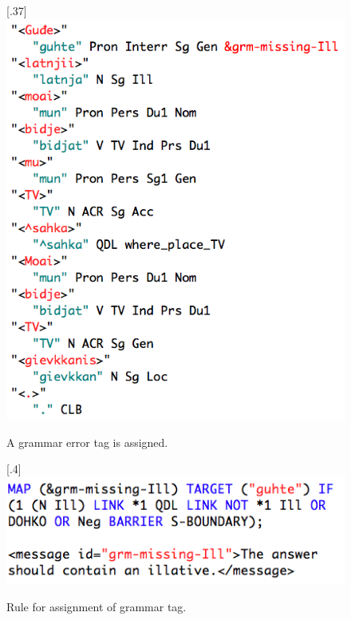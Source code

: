 \documentclass[11pt]{article}
\begin{document}
\begin{figure}[htbp]
\begin{center}
\scalebox{.37}[.37]{\includegraphics{presentation/img/gievkkanisAnalEng.png}}\\
\caption{A grammar error tag is assigned. }
\label{hivssetloc}
\end{center}
\end{figure}


\begin{figure}[htbp]
\begin{center}
\scalebox{.4}[.4]{\includegraphics{presentation/img/missingIll.png}}\\
\caption{Rule for assignment of grammar tag.}
\label{missingill}
\end{center}
\end{figure}
\end{document}
